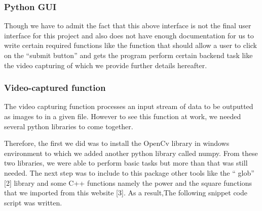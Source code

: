 \documentclass[onecolumn, draftclsnofoot,10pt, compsoc]{IEEEtran}
\begin{document}
\begin{singlespace}
		\subsubsection{ Python GUI }
				
			
			Though  we have to admit the fact that this above interface is not the final user interface for this project and also does not have enough documentation for us to write certain required functions like the function that should allow a user to click on the “submit button” and gets the program  perform certain  backend task like the video capturing of which we provide further details hereafter.
			
			\subsubsection{ Video-captured function  }
				The video capturing function processes an input stream of data to be outputted as  images  to in a given file. However to see this function at work, we needed several python libraries to come together.
		
		Therefore, the first  we did was to install the OpenCv library in windows environment to which we added another python library called numpy.   From these two libraries, we were able to perform basic tasks but more than that was still needed. The next step was to include to this package other tools  like the  “ glob” [2] library and some C++ functions namely the power and the square functions that we  imported from this website [3]. As a result,The following  snippet code script was written.


\end{singlespace}
\end{document}
